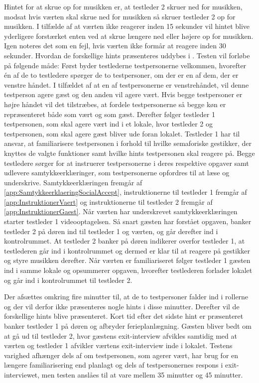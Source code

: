 Hintet for at skrue op for musikken er, at testleder 2 skruer ned for musikken, modsat hvis værten skal skrue ned for musikken så skruer testleder 2 op for musikken. I tilfælde af at værten ikke reagerer inden 15 sekunder vil hintet blive yderligere forstærket enten ved at skrue længere ned eller højere op for musikken. Igen noteres det som en fejl, hvis værten ikke formår at reagere inden 30 sekunder. Hvordan de forskellige hints præsenteres uddybes i .\blankline
% 
Testen vil forløbe på følgende måde: Først byder testlederne testpersonerne velkommen, hvorefter én af de to testledere spørger de to testpersoner, om der er en af dem, der er venstre håndet. I tilfældet af at en af testpersonerne er venstrehåndet, vil denne testperson agere gæst og den anden vil agere vært. Hvis begge testpersoner er højre håndet vil det tilstræbes, at fordele testpersonerne så begge køn er repræsenteret både som vært og som gæst. Derefter følger testleder 1 testpersonen, som skal agere vært ind i et lokale, hvor testleder 2 og testpersonen, som skal agere gæst bliver ude foran lokalet. Testleder 1 har til ansvar, at familiarisere testpersonen i forhold til hvilke semaforiske gestikker, der knyttes de valgte funktioner samt hvilke hints testpersonen skal reagere på. Begge testledere sørger for at instruerer testpersonerne i deres respektive opgaver samt udlevere samtykkeerklæringer, som testpersonerne opfordres til at læse og underskrive. Samtykkeerklæringen fremgår af \autoref{app:SamtykkeerklaeringSocialAccept}, instruktionerne til testleder 1 fremgår af \autoref{app:InstruktionerVaert} og instruktionerne til testleder 2 fremgår af \autoref{app:InstruktionerGaest}. Når værten har underskrevet samtykkeerklæringen starter testleder 1 videooptagelsen. Så snart gæsten har forstået opgaven, banker testleder 2 på døren ind til testleder 1 og værten, og går derefter ind i kontrolrummet. At testleder 2 banker på døren indikerer overfor testleder 1, at testlederen går ind i kontrolrummet og dermed er klar til at reagere på gestikker og styre musikken derefter. Når værten er familiariseret følger testleder 1 gæsten ind i samme lokale og opsummerer opgaven, hvorefter testlederen forlader lokalet og går ind i kontrolrummet til testleder 2.
 
Der afsættes omkring fire minutter til, at de to testpersoner falder ind i rollerne og der vil derfor ikke præsenteres nogle hints i disse minutter. Derefter vil de forskellige hints blive præsenteret. Kort tid efter det sidste hint er præsenteret banker testleder 1 på døren og afbryder ferieplanlægning. Gæsten bliver bedt om at gå ud til testleder 2, hvor gæstens exit-interview afvikles samtidig med at værten og testleder 1 afvikler værtens exit-interview inde i lokalet.\blankline
%
Testens varighed afhænger dels af om testpersonen, som agerer vært, har brug for en længere familiarisering end planlagt og dels af testpersonernes respons i exit-interviewet, men testen anslåes til at vare mellem 35 minutter og 45 minutter. 
%
